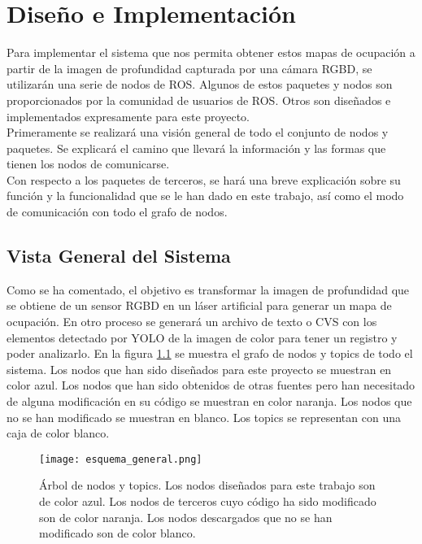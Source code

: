 \chapter{Diseño e Implementación}

Para implementar el sistema que nos permita obtener estos mapas de ocupación a partir de la imagen de profundidad capturada por una cámara RGBD, se utilizarán una serie de nodos de ROS. Algunos de estos paquetes y nodos son proporcionados por la comunidad de usuarios de ROS. Otros son diseñados e implementados expresamente para este proyecto.\\

Primeramente se realizará una visión general de todo el conjunto de nodos y paquetes. Se explicará el camino que llevará la información y las formas que tienen los nodos de comunicarse.\\

Con respecto a los paquetes de terceros, se hará una breve explicación sobre su función y la funcionalidad que se le han dado en este trabajo, así como el modo de comunicación con todo el grafo de nodos.\\

\section{Vista General del Sistema}

Como se ha comentado, el objetivo es transformar la imagen de profundidad que se obtiene de un sensor RGBD en un láser artificial para generar un mapa de ocupación. En otro proceso se generará un archivo de texto o CVS con los elementos detectado por YOLO de la imagen de color para tener un registro y poder analizarlo. En la figura \ref{fig:esq_general} se muestra el grafo de nodos y topics de todo el sistema. Los nodos que han sido diseñados para este proyecto se muestran en color azul. Los nodos que han sido obtenidos de otras fuentes pero han necesitado de alguna modificación en su código se muestran en color naranja. Los nodos que no se han modificado se muestran en blanco. Los topics se representan con una caja de color blanco.\\

\begin{figure}[h]
	\begin{center} 
		\texttt{[image: esquema\_general.png]}
	\end{center}
	\caption{Árbol de nodos y topics. Los nodos diseñados para este trabajo son de color azul. Los nodos de terceros cuyo código ha sido modificado son de color naranja. Los nodos descargados que no se han modificado son de color blanco.}
	\label{fig:esq_general}
\end{figure}

